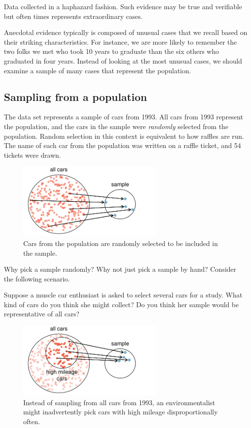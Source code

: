 \begin{termBox}{
Data collected in a haphazard fashion. Such evidence may be true and verifiable but often times represents extraordinary cases.}
\end{termBox}

Anecdotal evidence typically is composed of unusual cases that we recall based on their striking characteristics. For instance, we are more likely to remember the two folks we met who took 10 years to graduate than the six others who graduated in four years. Instead of looking at the most unusual cases, we should examine a sample of many cases that represent the population.

\subsection{Sampling from a population}

The  data set represents a {sample} of cars from 1993. All cars from 1993 represent the {population}, and the cars in the sample were \emph{randomly} selected from the population. Random selection in this context is equivalent to how raffles are run. The name of each car from the population was written on a raffle ticket, and 54 tickets were drawn.
\begin{figure}[ht]
\centering
\includegraphics[height=1.5in]{01/figures/popToSample/popToSample}
\caption{Cars from the population are randomly selected to be included in the sample.}
\label{popToSample}
\end{figure}

Why pick a sample randomly? Why not just pick a sample by hand? Consider the following scenario.

\begin{exercise}
Suppose a muscle car enthusiast is asked to select several cars for a study. What kind of cars do you think she might collect? Do you think her sample would be representative of all cars?
\end{exercise}
\begin{figure}
\centering
\includegraphics[height=1.5in]{01/figures/popToSample/popToSubSample}
\caption{Instead of sampling from all cars from 1993, an environmentalist might inadvertently pick cars with high mileage disproportionally often.}
\label{popToSubSample}
\end{figure}

